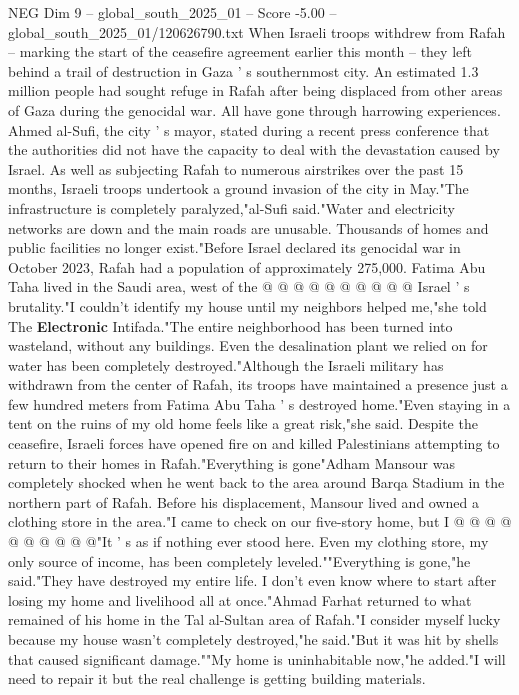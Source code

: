 \begin{textsample}{NEG Dim 9 – global\_south\_2025\_01 – Score -5.00 – global\_south\_2025\_01/120626790.txt}  \label{ex:f9_neg_107}
When Israeli troops withdrew from Rafah -- marking the start of the ceasefire agreement earlier this month -- they left behind a trail of destruction in Gaza ' s southernmost city.
An estimated 1.3 million people had sought refuge in Rafah after being displaced from other areas of Gaza during the genocidal war.
All have gone through harrowing experiences.
Ahmed al-Sufi, the city ' s mayor, stated during a recent press conference that the authorities did not have the capacity to deal with the devastation caused by Israel.
As well as subjecting Rafah to numerous airstrikes over the past 15 months, Israeli troops undertook a ground invasion of the city in May."The infrastructure is completely paralyzed,"al-Sufi said."Water and electricity networks are down and the main roads are unusable.
Thousands of homes and public facilities no longer exist."Before Israel declared its genocidal war in October 2023, Rafah had a population of approximately 275,000.
Fatima Abu Taha lived in the Saudi area, west of the @ @ @ @ @ @ @ @ @ @ Israel ' s brutality."I couldn't identify my house until my neighbors helped me,"she told The \textbf{Electronic} Intifada."The entire neighborhood has been turned into wasteland, without any buildings.
Even the desalination plant we relied on for water has been completely destroyed."Although the Israeli military has withdrawn from the center of Rafah, its troops have maintained a presence just a few hundred meters from Fatima Abu Taha ' s destroyed home."Even staying in a tent on the ruins of my old home feels like a great risk,"she said.
Despite the ceasefire, Israeli forces have opened fire on and killed Palestinians attempting to return to their homes in Rafah."Everything is gone"Adham Mansour was completely shocked when he went back to the area around Barqa Stadium in the northern part of Rafah.
Before his displacement, Mansour lived and owned a clothing store in the area."I came to check on our five-story home, but I @ @ @ @ @ @ @ @ @ @"It ' s as if nothing ever stood here.
Even my clothing store, my only source of income, has been completely leveled.""Everything is gone,"he said."They have destroyed my entire life.
I don't even know where to start after losing my home and livelihood all at once."Ahmad Farhat returned to what remained of his home in the Tal al-Sultan area of Rafah."I consider myself lucky because my house wasn't completely destroyed,"he said."But it was hit by shells that caused significant damage.""My home is uninhabitable now,"he added."I will need to repair it but the real challenge is getting building materials.

\end{textsample}
